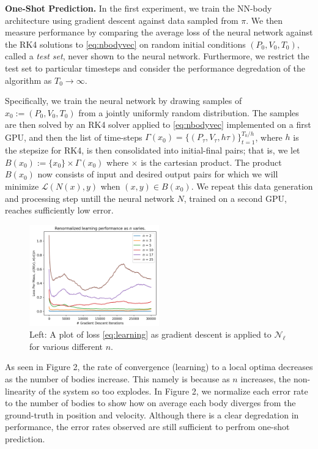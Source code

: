 \documentclass{article}
\numberwithin{theorem}{section}
\numberwithin{equation}{section}
\def\scriptl{{\mathcal L}}
\def\scriptn{{\mathcal N}}
\begin{document}
 \textbf{One-Shot Prediction.} In the first experiment, we train the NN-body architecture using gradient descent against data sampled from $\pi.$ We then measure performance by comparing the average loss of the neural network against the RK4 solutions to \eqref{eq:nbodyvec} on random initial conditions $(P_0, V_0, T_0),$ called a \emph{test set}, never shown to the neural network. Furthermore, we restrict the test set to particular timesteps and consider the performance degredation of the algorithm as $T_0 \to \infty.$ 

 Specifically, we train the neural network by drawing samples of $x_0 := (P_0, V_0, T_0)$ from a jointly uniformly random distribution. The samples are then solved by an RK4 solver applied to \eqref{eq:nbodyvec} implemented on a first GPU, and then the list of time-steps $\Gamma(x_0) = \{(P_\tau, V_\tau, h\tau)\}_{t=1}^{T_0/h}$, where $h$ is the stepsize for RK4, is then consolidated into initial-final pairs; that is, we let $B(x_0) := \{x_0\} \times \Gamma(x_0)$ where $\times$ is the cartesian product. The product $B(x_0)$ now consists of input and desired output pairs for which we will minimize $\scriptl(N(x), y)$ when $(x,y) \in B(x_0)$. We repeat this data generation and processing step untill the neural network $N$, trained on a second GPU, reaches sufficiently low error.


\begin{figure}
\vspace{-21pt}
  \begin{center}
    \includegraphics[width=0.5\textwidth]{renormalized.png}
  \end{center}
  \label{fig:renormal}
  \caption{Left: A plot of loss \eqref{eq:learning} as gradient descent is applied to $\scriptn_\ell$ for various different $n$.}
  \vspace{25pt}
\end{figure}

 As seen in Figure 2, the rate of convergence (learning) to a local optima decreases as the number of bodies increase. This namely is because as $n$ increases, the non-linearity of the system so too explodes. In Figure 2, we normalize each error rate to the number of bodies to show how on average each body diverges from the ground-truth in position and velocity. Although there is a clear degredation in performance, the error rates observed are still sufficient to  perfrom one-shot prediction.
\end{document}
